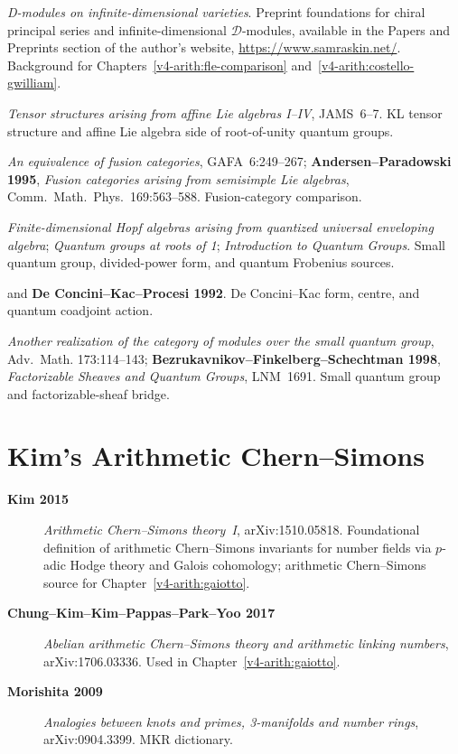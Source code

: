 \begin{description}
\emph{D-modules on infinite-dimensional varieties}. Preprint
foundations for chiral principal series and infinite-dimensional
\(\mathcal{D}\)-modules, available in the Papers and Preprints
section of the author's website, \url{https://www.samraskin.net/}.
Background for Chapters~\ref{v4-arith:fle-comparison}
and~\ref{v4-arith:costello-gwilliam}.
\item[\textbf{Kazhdan--Lusztig 1993--1994}] \emph{Tensor structures
arising from affine Lie algebras I--IV}, JAMS~6--7. KL tensor
structure and affine Lie algebra side of root-of-unity quantum
groups.
\item[\textbf{Finkelberg 1996}] \emph{An equivalence of fusion
categories}, GAFA~6:249--267; \textbf{Andersen--Paradowski 1995},
\emph{Fusion categories arising from semisimple Lie algebras},
Comm.~Math.~Phys.~169:563--588. Fusion-category comparison.
\item[\textbf{Lusztig 1990--1993}] \emph{Finite-dimensional Hopf
algebras arising from quantized universal enveloping algebra};
\emph{Quantum groups at roots of 1}; \emph{Introduction to Quantum
Groups}. Small quantum group, divided-power form, and quantum
Frobenius sources.
\item[\textbf{De Concini--Kac 1990}] and \textbf{De Concini--Kac--Procesi
1992}. De Concini--Kac form, centre, and quantum coadjoint action.
\item[\textbf{Arkhipov--Gaitsgory 2003}] \emph{Another realization
of the category of modules over the small quantum group}, Adv.~Math.
173:114--143; \textbf{Bezrukavnikov--Finkelberg--Schechtman 1998},
\emph{Factorizable Sheaves and Quantum Groups}, LNM~1691. Small
quantum group and factorizable-sheaf bridge.
\end{description}

\section{Kim's Arithmetic Chern--Simons}
\label{v4-arith:app:A:kim}

\begin{description}
\item[\textbf{Kim 2015}] \emph{Arithmetic Chern--Simons theory~I},
arXiv:1510.05818. Foundational definition of arithmetic
Chern--Simons invariants for number fields via \(p\)-adic Hodge
theory and Galois cohomology; arithmetic Chern--Simons source
for Chapter~\ref{v4-arith:gaiotto}.
\item[\textbf{Chung--Kim--Kim--Pappas--Park--Yoo 2017}] \emph{Abelian
arithmetic Chern--Simons theory and arithmetic linking numbers},
arXiv:1706.03336. Used in Chapter~\ref{v4-arith:gaiotto}.
\item[\textbf{Morishita 2009}] \emph{Analogies between knots and
primes, 3-manifolds and number rings}, arXiv:0904.3399. MKR dictionary.
\end{description}

